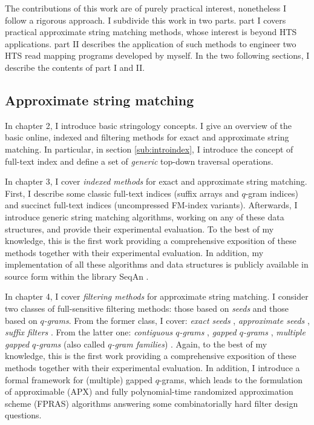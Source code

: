 The contributions of this work are of purely practical interest, nonetheless I follow a rigorous approach.
I subdivide this work in two parts.
part I covers practical approximate string matching methods, whose interest is beyond HTS applications.
part II describes the application of such methods to engineer two HTS read mapping programs developed by myself.
In the two following sections, I describe the contents of part I and II.

\subsection{Approximate string matching}

In chapter 2, I introduce basic stringology concepts.
I give an overview of the basic online, indexed and filtering methods for exact and approximate string matching.
In particular, in section \ref{sub:introindex}, I introduce the concept of full-text index and define a set of \emph{generic} top-down traversal operations.

In chapter 3, I cover \emph{indexed methods} for exact and approximate string matching.
First, I describe some classic full-text indices (suffix arrays and $q$-gram indices) and succinct full-text indices (uncompressed FM-index variants).
Afterwards, I introduce generic string matching algorithms, working on any of these data structures, and provide their experimental evaluation.
To the best of my knowledge, this is the first work providing a comprehensive exposition of these methods together with their experimental evaluation.
In addition, my implementation of all these algorithms and data structures is publicly available in source form within the \CC library SeqAn \citep{Doering2008}.

In chapter 4, I cover \emph{filtering methods} for approximate string matching.
I consider two classes of full-sensitive filtering methods: those based on \emph{seeds} and those based on \emph{$q$-grams}.
From the former class, I cover:
\emph{exact seeds} \citep{Baeza1992},
\emph{approximate seeds} \citep{Myers1994,Navarro2000},
\emph{suffix filters} \citep{Kaerkkaeinen2007}.
From the latter one:
\emph{contiguous $q$-grams} \citep{Jokinen1991},
\emph{gapped $q$-grams} \citep{Burkhardt2001},
\emph{multiple gapped $q$-grams} (also called \emph{$q$-gram families}) \citep{Kucherov2005}.
Again, to the best of my knowledge, this is the first work providing a comprehensive exposition of these methods together with their experimental evaluation.
In addition, I introduce a formal framework for (multiple) gapped $q$-grams, which leads to the formulation of approximable (APX) and fully polynomial-time randomized approximation scheme (FPRAS) algorithms answering some combinatorially hard filter design questions.

